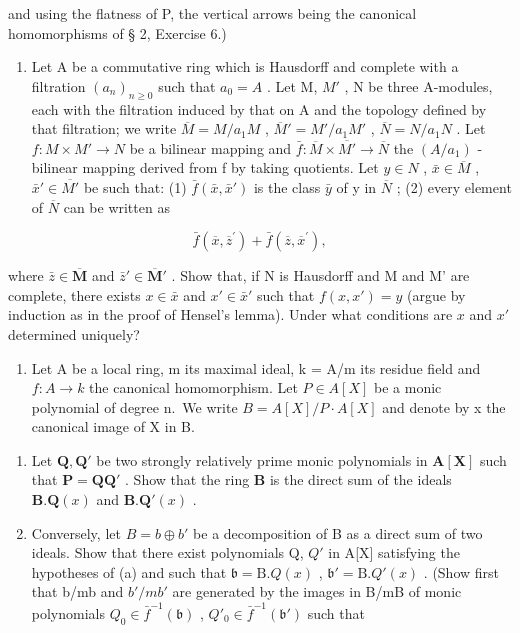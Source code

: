 and using the flatness of P, the vertical arrows being the canonical homomorphisms of § 2, Exercise 6.)


\begin{enumerate}
\def\labelenumi{\arabic{enumi}.}
\tightlist
\item
  Let A be a commutative ring which is Hausdorff and complete with a filtration \((a_{n})_{n\geq0}\) such that \(a_{0}=A\) . Let M, \(M'\) , N be three A-modules, each with the filtration induced by that on A and the topology defined by that filtration; we write \(\overline{M}=M/a_{1}M\) , \(\overline{M}'=M'/a_{1}M'\) , \(\overline{N}=N/a_{1}N\) . Let \(f: M\times M'\to N\) be a bilinear mapping and \(\bar{f}: \overline{M}\times\overline{M'}\to\overline{N}\) the \((A/a_{1})\) -bilinear mapping derived from f by taking quotients. Let \(y\in N\) , \(\bar{x}\in\overline{M}\) , \(\bar{x}'\in\overline{M'}\) be such that: (1) \(\bar{f}(\bar{x},\bar{x}')\) is the class \(\bar{y}\) of y in \(\overline{N}\) ; (2) every element of \(\overline{N}\) can be written as
\end{enumerate}

\[
\bar {f} (\overline {{{x}}}, \overline {{{z}}} ^ {\prime}) + \bar {f} (\overline {{{z}}}, \overline {{{x}}} ^ {\prime}),
\]

where \(\bar{z} \in \overline{\mathbf{M}}\) and \(\bar{z}' \in \overline{\mathbf{M}}'\) . Show that, if N is Hausdorff and M and M' are complete, there exists \(x \in \bar{x}\) and \(x' \in \bar{x}'\) such that \(f(x, x') = y\) (argue by induction as in the proof of Hensel's lemma). Under what conditions are \(x\) and \(x'\) determined uniquely?

\begin{enumerate}
\def\labelenumi{\arabic{enumi}.}
\setcounter{enumi}{1}
\tightlist
\item
  Let A be a local ring, m its maximal ideal, k = A/m its residue field and \(f: A \to k\) the canonical homomorphism. Let \(P \in A[X]\) be a monic polynomial of degree n.~We write \(B = A[X]/P \cdot A[X]\) and denote by x the canonical image of X in B.
\end{enumerate}

\begin{enumerate}
\def\labelenumi{(\alph{enumi})}
\item
  Let \(\mathbf{Q}, \mathbf{Q}'\) be two strongly relatively prime monic polynomials in \(\mathbf{A}[\mathbf{X}]\) such that \(\mathbf{P} = \mathbf{QQ}'\) . Show that the ring \(\mathbf{B}\) is the direct sum of the ideals \(\mathbf{B}. \mathbf{Q}(x)\) and \(\mathbf{B}. \mathbf{Q}'(x)\) .
\item
  Conversely, let \(B = b \oplus b'\) be a decomposition of B as a direct sum of two ideals. Show that there exist polynomials Q, \(Q'\) in A{[}X{]} satisfying the hypotheses of (a) and such that \(\mathfrak{b} = \mathrm{B}.Q(x)\) , \(\mathfrak{b}' = \mathrm{B}.Q'(x)\) . (Show first that b/mb and \(b'/mb'\) are generated by the images in B/mB of monic polynomials \(Q_{0} \in \bar{f}^{-1}(\mathfrak{b})\) , \(Q'_{0} \in \bar{f}^{-1}(\mathfrak{b}')\) such that
\end{enumerate}


